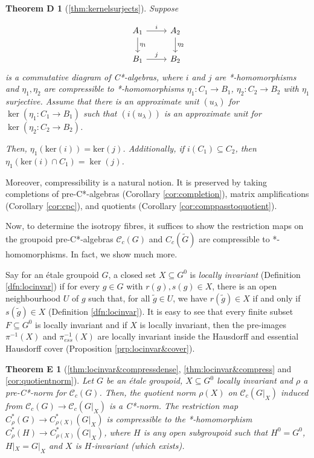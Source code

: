\documentclass[a4paper, 12pt]{amsart}
\newtheorem*{thmD}{Theorem D}
\newtheorem*{thmE}{Theorem E}
\theoremstyle{definition}
\theoremstyle{remark}
\numberwithin{equation}{section}
\begin{document}
\begin{thmD}[\ref{thm:kernelsurjects}]
    Suppose 

    $$
\begin{tikzcd}
A_{1} \arrow[r, "i"] \arrow[d, "\eta_{1}"] & A_{2} \arrow[d, "\eta_{2}"] \\
B_{1} \arrow[r, "j"]                       & B_{2}                      
\end{tikzcd}$$ is a commutative diagram of C*-algebras, where $i$ and $j$ are *-homomorphisms and $\eta_{1},\eta_{2}$ are compressible to *-homomorphisms $\eta_{1}:C_{1}\to B_{1}$, $\eta_{2}:C_{2}\to B_{2}$ with $\eta_{1}$ surjective. Assume that there is an approximate unit $(u_{\lambda})$ for $\ker(\eta_{1}:C_{1}\to B_{1})$ such that $(i(u_{\lambda}))$ is an approximate unit for $\ker(\eta_{2}:C_{2}\to B_{2})$. 

Then, $\eta_{1}(\text{ker}(i)) = \text{ker}(j)$. Additionally, if $i(C_{1})\subseteq C_{2}$, then $\eta_{1}(\text{ker}(i)\cap C_{1}) = \ker(j)$.
\end{thmD}

Moreover, compressibility is a natural notion. It is preserved by taking completions of pre-C*-algebras (Corollary \ref{cor:completion}), matrix amplifications (Corollary \ref{cor:cpc}), and quotients (Corollary \ref{cor:comppasstoquotient}).

Now, to determine the isotropy fibres, it suffices to show the restriction maps on the groupoid pre-C*-algebras $\mathscr{C}_{c}(G)$ and $C_{c}(\tilde{G})$ are compressible to *-homomorphisms. In fact, we show much more.

Say for an \'etale groupoid $G$, a closed set $X\subseteq G^{0}$ is \emph{locally invariant} (Definition \ref{dfn:locinvar}) if for every $g\in G$ with $r(g), s(g)\in X$, there is an open neighbourhood $U$ of $g$ such that, for all $\tilde{g}\in U$, we have $r(\tilde{g})\in X$ if and only if $s(\tilde{g})\in X$ (Definition \ref{dfn:locinvar}). 
It is easy to see that every finite subset $F\subseteq G^{0}$ is locally invariant and if $X$ is locally invariant, then the pre-images $\pi^{-1}(X)$ and $\pi_{ess}^{-1}(X)$ are locally invariant inside the Hausdorff and essential Hausdorff cover (Proposition \ref{prp:locinvar&cover}).

\begin{thmE}[\ref{thm:locinvar&compressdense}, \ref{thm:locinvar&compress} and \ref{cor:quotientnorm}]
    Let $G$ be an \'etale groupoid, $X\subseteq G^{0}$ locally invariant and $\rho$ a pre-C*-norm for $\mathscr{C}_{c}(G)$. Then, the quotient norm $\rho(X)$ on $\mathscr{C}_{c}(G|_{X})$ induced from $\mathscr{C}_{c}(G)\to \mathscr{C}_{c}(G|_{X})$ is a C*-norm. The restriction map $C^{*}_{\rho}(G)\to C^{*}_{\rho(X)}(G|_{X})$ is compressible to the *-homomorphism $C^{*}_{\rho}(H)\to C^{*}_{\rho(X)}(G|_{X})$, where $H$ is any open subgroupoid such that $H^{0} = G^{0}$, $H|_{X} = G|_{X}$ and $X$ is $H$-invariant (which exists).
\end{thmE}
\end{document}
